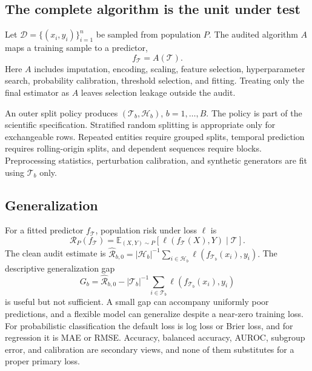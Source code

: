 \documentclass[10pt,twocolumn]{article}
\newcommand{\E}{\mathbb{E}}
\newcommand{\risk}{\mathcal{R}}
\newcommand{\data}{\mathcal{D}}
\newcommand{\train}{\mathcal{T}}
\newcommand{\audit}{\mathcal{H}}
\newcommand{\loss}{\ell}
\begin{document}
\subsection{The complete algorithm is the unit under test}

Let \(\data=\{(x_i,y_i)\}_{i=1}^n\) be sampled from population \(P\). The audited algorithm \(A\) maps a training sample to a predictor,
\[
  f_{\train}=A(\train).
\]
Here \(A\) includes imputation, encoding, scaling, feature selection, hyperparameter search, probability calibration, threshold selection, and fitting. Treating only the final estimator as \(A\) leaves selection leakage outside the audit.

An outer split policy produces \((\train_b,\audit_b)\), \(b=1,\ldots,B\). The policy is part of the scientific specification. Stratified random splitting is appropriate only for exchangeable rows. Repeated entities require grouped splits, temporal prediction requires rolling-origin splits, and dependent sequences require blocks. Preprocessing statistics, perturbation calibration, and synthetic generators are fit using \(\train_b\) only.

\subsection{Generalization}

For a fitted predictor \(f_{\train}\), population risk under loss \(\loss\) is
\begin{equation}
  \risk_P(f_{\train})
  = \E_{(X,Y)\sim P}\!\left[\loss(f_{\train}(X),Y)\mid\train\right].
  \label{eq:generalization}
\end{equation}
The clean audit estimate is
\(
\widehat{\risk}_{b,0}=|\audit_b|^{-1}\sum_{i\in\audit_b}
\loss(f_{\train_b}(x_i),y_i).
\)
The descriptive generalization gap
\begin{equation}
  G_b=\widehat{\risk}_{b,0}
      -|\train_b|^{-1}\sum_{i\in\train_b}\loss(f_{\train_b}(x_i),y_i)
  \label{eq:gap}
\end{equation}
is useful but not sufficient. A small gap can accompany uniformly poor predictions, and a flexible model can generalize despite a near-zero training loss. For probabilistic classification the default loss is log loss or Brier loss, and for regression it is MAE or RMSE. Accuracy, balanced accuracy, AUROC, subgroup error, and calibration are secondary views, and none of them substitutes for a proper primary loss.
\end{document}
